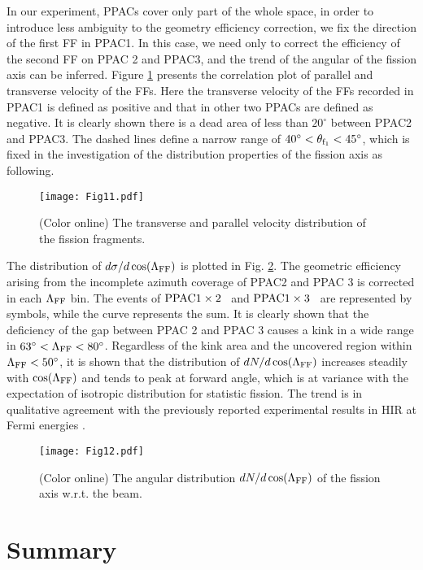 \documentclass[submitting]{nst}
\def\pacab{${\rm PPAC 1\times 2}$}
\def\pacac{${\rm PPAC 1\times 3}$}
\begin{document}
In our experiment, PPACs cover only part of the whole space, in order to introduce less ambiguity to the geometry efficiency correction, we fix the direction of the first FF in PPAC1. In this case, we need only to correct the efficiency of the second FF on PPAC 2 and PPAC3, and the trend of the angular of the fission axis can be inferred. Figure \ref{v_pp} presents  the correlation plot of  parallel and transverse velocity of the FFs. Here the transverse  velocity of the FFs recorded in PPAC1 is defined as positive and that in other two PPACs are defined as negative. It is clearly shown there is a dead area of less than $20^\circ$ between PPAC2 and PPAC3. The dashed lines define a narrow range of $40^\circ<\theta_{\rm f_1}<45^\circ$, which is fixed in the investigation of the distribution properties of the fission axis as following. 

\begin{figure}[!htb]
\texttt{[image: Fig11.pdf]}
\caption{(Color online) The transverse and parallel velocity distribution of the fission fragments.}
\label{v_pp}
\end{figure}

The  distribution of $d\sigma/d\cos (\Lambda_{\rm FF})$ is plotted in Fig. \ref{lambda}. The geometric efficiency arising from the incomplete azimuth coverage of PPAC2 and PPAC 3 is corrected in each $\Lambda_{\rm FF}$ bin. The events of \pacab~ and \pacac~ are represented by  symbols, while  the curve represents the sum. It is clearly shown that the deficiency of the gap between PPAC 2 and PPAC 3 causes a kink in a wide range in $63^\circ<\Lambda_{\rm FF}<80^\circ$. Regardless of the kink area and the uncovered region within $\Lambda_{\rm FF}<50^\circ$, it is shown that the distribution of $dN/d\cos (\Lambda_{\rm FF})$ increases steadily  with  $\cos(\Lambda_{\rm FF})$ and tends to peak at forward angle, which is at variance with the expectation of isotropic distribution for statistic fission. The trend is in qualitative agreement with the previously reported experimental results in HIR at Fermi energies \cite{Bocage2000,Filippo2005}.  

\begin{figure}[!htb]
\texttt{[image: Fig12.pdf]}
\caption{(Color online) The angular distribution  $dN/d\cos (\Lambda_{\rm FF})$ of the fission axis w.r.t. the beam.}
\label{lambda}
\end{figure}

\section{Summary}\label{sec.V}
\end{document}

